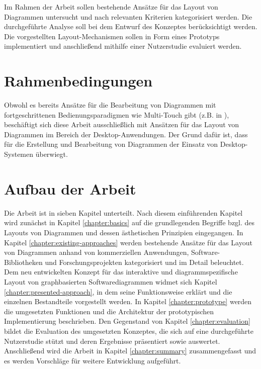 Im Rahmen der Arbeit sollen bestehende Ansätze für das Layout von Diagrammen untersucht und nach relevanten Kriterien kategorisiert werden. Die durchgeführte Analyse soll bei dem Entwurf des Konzeptes berücksichtigt werden. Die vorgestellten Layout-Mechanismen sollen in Form eines Prototyps implementiert und anschließend mithilfe einer Nutzerstudie evaluiert werden.

\section{Rahmenbedingungen}
\label{sec:thesis-conditions}

Obwohl es bereits Ansätze für die Bearbeitung von Diagrammen mit fortgeschrittenen Bedienungsparadigmen wie Multi-Touch gibt (z.B. in \cite{FrischHeydekorn10Diagram}), beschäftigt sich diese Arbeit ausschließlich mit Ansätzen für das Layout von Diagrammen im Bereich der Desktop-Anwendun\-gen. Der Grund dafür ist, dass für die Erstellung und Bearbeitung von Diagrammen der Einsatz von Desktop-Systemen überwiegt.

\section{Aufbau der Arbeit}

Die Arbeit ist in sieben Kapitel unterteilt. Nach diesem einführenden Kapitel wird zunächst in Kapitel \ref{chapter:basics} auf die grundlegenden Begriffe bzgl. des Layouts von Diagrammen und dessen ästhetischen Prinzipien eingegangen. In Kapitel \ref{chapter:existing-approaches} werden bestehende Ansätze für das Layout von Diagrammen anhand von kommerziellen Anwendungen, Software-Bibliotheken und Forschungsprojekten kategorisiert und im Detail beleuchtet. Dem neu entwickelten Konzept für das interaktive und diagrammspezifische Layout von graphbasierten Softwarediagrammen widmet sich Kapitel \ref{chapter:presented-approach}, in dem seine Funktionsweise erklärt und die einzelnen Bestandteile vorgestellt werden. In Kapitel \ref{chapter:prototype} werden die umgesetzten Funktionen und die Architektur der prototypischen Implementierung beschrieben. Den Gegenstand von Kapitel \ref{chapter:evaluation} bildet die Evaluation des umgesetzten Konzeptes, die sich auf eine durchgeführte Nutzerstudie stützt und deren Ergebnisse präsentiert sowie auswertet. Anschließend wird die Arbeit in Kapitel \ref{chapter:summary} zusammengefasst und es werden Vorschläge für weitere Entwicklung aufgeführt.
